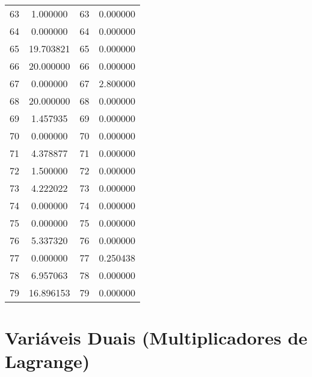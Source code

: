 \documentclass[12pt]{article}
\begin{document}
\begin{longtable}{@{}cccc@{}}
63 & 1.000000 & 63 & 0.000000 \\
64 & 0.000000 & 64 & 0.000000 \\
65 & 19.703821 & 65 & 0.000000 \\
66 & 20.000000 & 66 & 0.000000 \\
67 & 0.000000 & 67 & 2.800000 \\
68 & 20.000000 & 68 & 0.000000 \\
69 & 1.457935 & 69 & 0.000000 \\
70 & 0.000000 & 70 & 0.000000 \\
71 & 4.378877 & 71 & 0.000000 \\
72 & 1.500000 & 72 & 0.000000 \\
73 & 4.222022 & 73 & 0.000000 \\
74 & 0.000000 & 74 & 0.000000 \\
75 & 0.000000 & 75 & 0.000000 \\
76 & 5.337320 & 76 & 0.000000 \\
77 & 0.000000 & 77 & 0.250438 \\
78 & 6.957063 & 78 & 0.000000 \\
79 & 16.896153 & 79 & 0.000000 \\

\end{longtable}

\section{Variáveis Duais (Multiplicadores de Lagrange)}
\end{document}
